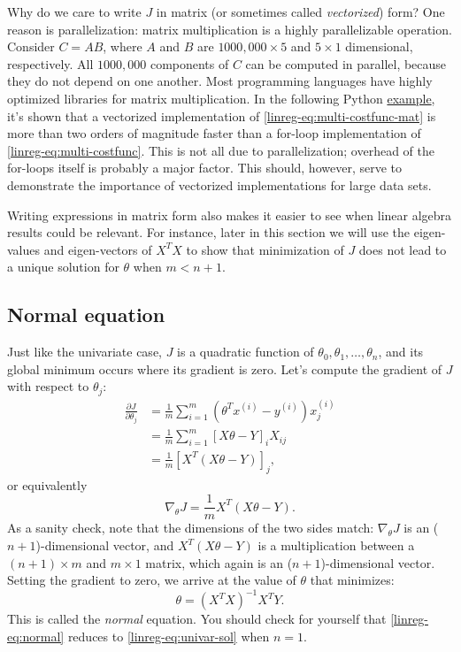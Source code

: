 \documentclass{article}
\begin{document}
Why do we care to write $J$ in matrix (or sometimes called \textit{vectorized}) form? One reason is parallelization: matrix multiplication is a highly parallelizable operation. Consider $C=AB$, where $A$ and $B$ are $1000,000 \times 5$ and $5 \times 1$ dimensional, respectively. All $1000,000$ components of $C$ can be computed in parallel, because they do not depend on one another. Most programming languages have highly optimized libraries for matrix multiplication. In the following Python \href{https://github.com/siavashaslanbeigi/machine_learning/blob/master/lin_reg/matrix.ipynb}{\color{blue} example}, it's shown that a vectorized implementation of \eqref{linreg-eq:multi-costfunc-mat} is more than two orders of magnitude faster than a for-loop implementation of \eqref{linreg-eq:multi-costfunc}. This is not all due to parallelization; overhead of the for-loops itself is probably a major factor. This should, however, serve to demonstrate the importance of vectorized implementations for large data sets.

Writing expressions in matrix form also makes it easier to see when linear algebra results could be relevant. For instance, later in this section we will use the eigen-values and eigen-vectors of $X^TX$ to show that minimization of $J$ does not lead to a unique solution for $\theta$ when $m<n+1$.


\subsection{Normal equation}
Just like the univariate case, $J$ is a quadratic function of $\theta_0, \theta_1, \dots, \theta_n$, and its global minimum occurs where its gradient is zero. Let's compute the gradient of $J$ with respect to $\theta_j$:
\begin{align*}
    \frac{\partial J}{\partial \theta_j} &= \frac{1}{m}\sum_{i=1}^{m}(\theta^Tx^{(i)} - y^{(i)})x^{(i)}_j\\
    &=\frac{1}{m}\sum_{i=1}^{m}[X\theta - Y]_iX_{ij}\\
    &=\frac{1}{m}[X^T(X\theta - Y)]_j,
\end{align*}
or equivalently
\begin{equation}
    \nabla_{\theta} J = \frac{1}{m}X^T(X\theta - Y).
\end{equation}
As a sanity check, note that the dimensions of the two sides match: $\nabla_{\theta} J$ is an ($n+1$)-dimensional vector, and $X^T(X\theta - Y)$ is a multiplication between a $(n+1) \times m$ and $m \times 1$ matrix, which again is an ($n+1$)-dimensional vector. Setting the gradient to zero, we arrive at the value of $\theta$ that minimizes:
\begin{equation}
    \theta = \left(X^TX\right)^{-1}X^TY.
    \label{linreg-eq:normal}
\end{equation}
This is called the \textit{normal} equation. You should check for yourself that \eqref{linreg-eq:normal} reduces to \eqref{linreg-eq:univar-sol} when $n = 1$.
\end{document}
